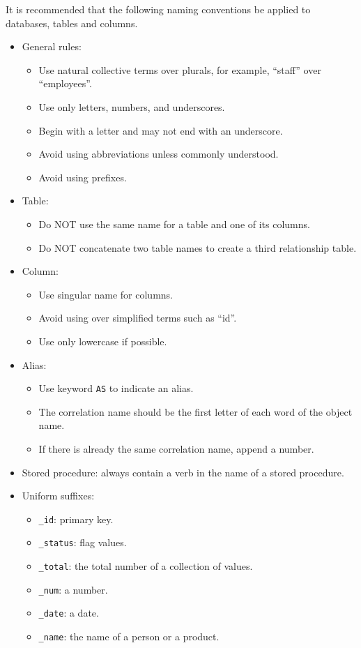 It is recommended that the following naming conventions be applied to databases, tables and columns.
\begin{itemize}
\item General rules:
\begin{itemize}
\item Use natural collective terms over plurals, for example, ``staff'' over ``employees''.
\item Use only letters, numbers, and underscores.
\item Begin with a letter and may not end with an underscore.
\item Avoid using abbreviations unless commonly understood.
\item Avoid using prefixes.
\end{itemize}
\item Table:
\begin{itemize}
	\item Do NOT use the same name for a table and one of its columns.
	\item Do NOT concatenate two table names to create a third relationship table.
\end{itemize}
\item Column:
\begin{itemize}
	\item Use singular name for columns.
	\item Avoid using over simplified terms such as ``id''.
	\item Use only lowercase if possible.
\end{itemize}
\item Alias:
\begin{itemize}
	\item Use keyword \verb|AS| to indicate an alias.
	\item The correlation name should be the first letter of each word of the object name.
	\item If there is already the same correlation name, append a number.
\end{itemize}
\item Stored procedure: always contain a verb in the name of a stored procedure.
\item Uniform suffixes:
\begin{itemize}
	\item \verb|_id|: primary key.
	\item \verb|_status|: flag values.
	\item \verb|_total|: the total number of a collection of values.
	\item \verb|_num|: a number.
	\item \verb|_date|: a date.
	\item \verb|_name|: the name of a person or a product.
\end{itemize}
\end{itemize}

